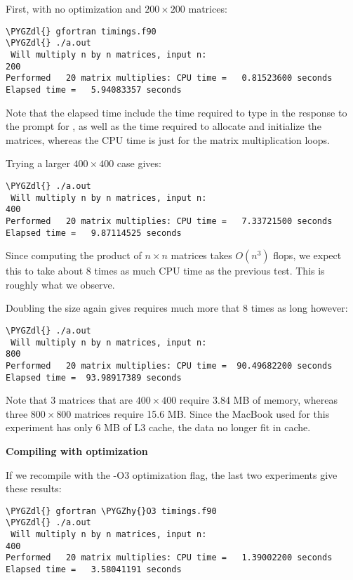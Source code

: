 \documentclass[letterpaper,10pt,english]{sphinxmanual}
\def\PYGZdl{\char`\$}
\def\PYGZhy{\char`\-}
\begin{document}
First, with no optimization and \(200\times 200\) matrices:

\begin{Verbatim}[commandchars=\\\{\}]
\PYGZdl{} gfortran timings.f90
\PYGZdl{} ./a.out
 Will multiply n by n matrices, input n:
200
Performed   20 matrix multiplies: CPU time =   0.81523600 seconds
Elapsed time =   5.94083357 seconds
\end{Verbatim}

Note that the elapsed time include the time required to type in the response
to the prompt for , as well as the time required to allocate and
initialize the matrices, whereas the CPU time is just for the matrix
multiplication loops.

Trying a larger \(400 \times 400\) case gives:

\begin{Verbatim}[commandchars=\\\{\}]
\PYGZdl{} ./a.out
 Will multiply n by n matrices, input n:
400
Performed   20 matrix multiplies: CPU time =   7.33721500 seconds
Elapsed time =   9.87114525 seconds
\end{Verbatim}

Since computing the product of \(n \times n\) matrices takes
\(O(n^3)\) flops,
we expect this to take about 8 times as much CPU time as the previous test.
This is roughly what we observe.

Doubling the size again gives requires much more that 8 times as long
however:

\begin{Verbatim}[commandchars=\\\{\}]
\PYGZdl{} ./a.out
 Will multiply n by n matrices, input n:
800
Performed   20 matrix multiplies: CPU time =  90.49682200 seconds
Elapsed time =  93.98917389 seconds
\end{Verbatim}

Note that 3 matrices that are \(400\times 400\) require 3.84 MB of memory,
whereas three \(800 \times 800\) matrices require 15.6 MB.  Since the MacBook
used for this experiment
has only 6 MB of L3 cache, the data no longer fit in cache.

\textbf{Compiling with optimization}

If we recompile with the -O3 optimization flag, the last two experiments
give these results:

\begin{Verbatim}[commandchars=\\\{\}]
\PYGZdl{} gfortran \PYGZhy{}O3 timings.f90
\PYGZdl{} ./a.out
 Will multiply n by n matrices, input n:
400
Performed   20 matrix multiplies: CPU time =   1.39002200 seconds
Elapsed time =   3.58041191 seconds
\end{Verbatim}
\end{document}
